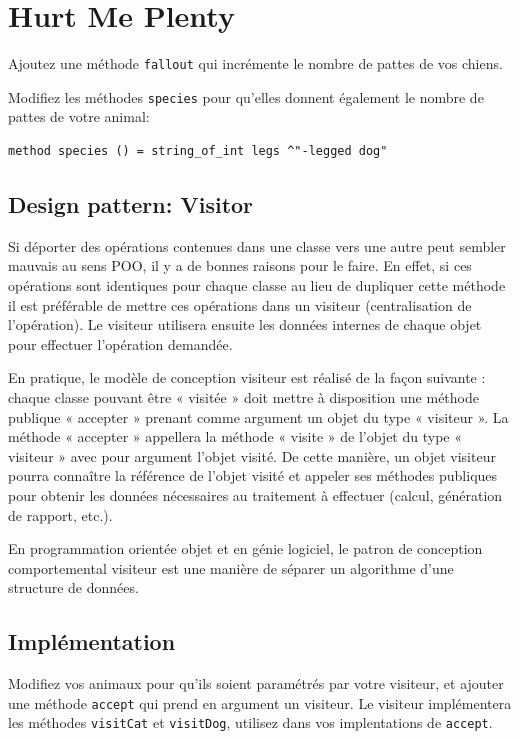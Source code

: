 \documentclass[a4paper]{article}
\begin{document}
\section{Hurt Me Plenty}

Ajoutez une méthode \verb|fallout| qui incrémente le nombre de pattes de vos
chiens.

Modifiez les méthodes \verb|species| pour qu'elles donnent également le
nombre de pattes de votre animal:

\begin{verbatim}
method species () = string_of_int legs ^"-legged dog"
\end{verbatim}


\subsection{Design pattern: Visitor}

Si déporter des opérations contenues dans une classe vers une autre peut
sembler mauvais au sens POO, il y a de bonnes raisons pour le faire. En effet,
si ces opérations sont identiques pour chaque classe au lieu de dupliquer cette
méthode il est préférable de mettre ces opérations dans un visiteur
(centralisation de l'opération). Le visiteur utilisera ensuite les données
internes de chaque objet pour effectuer l'opération demandée.

En pratique, le modèle de conception visiteur est réalisé de la façon suivante
: chaque classe pouvant être « visitée » doit mettre à disposition une méthode
publique « accepter » prenant comme argument un objet du type « visiteur ». La
méthode « accepter » appellera la méthode « visite » de l'objet du type «
visiteur » avec pour argument l'objet visité. De cette manière, un objet
visiteur pourra connaître la référence de l'objet visité et appeler ses
méthodes publiques pour obtenir les données nécessaires au traitement à
effectuer (calcul, génération de rapport, etc.).

En programmation orientée objet et en génie logiciel, le patron de conception
comportemental visiteur est une manière de séparer un algorithme d'une
structure de données.

\subsection{Implémentation}

Modifiez vos animaux pour qu'ils soient paramétrés par votre visiteur, et
ajouter une méthode \verb|accept| qui prend en argument un visiteur. Le
visiteur implémentera les méthodes \verb|visitCat| et \verb|visitDog|, utilisez
dans vos implentations de \verb|accept|.
\end{document}
